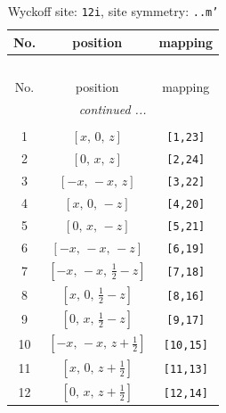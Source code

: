\documentclass[fleqn,8pt]{jsarticle}
\begin{document}
\begin{longtable}{ccc}
\caption{Wyckoff site: {\tt 12i}, site symmetry: {\tt ..m'}}
 \\
 \hline \hline
No. & position & mapping \\ \hline \endfirsthead

\multicolumn{2}{l}{\tablename\ \thetable{}} \\
 \hline \hline
No. & position & mapping \\ \hline \endhead

 \hline \hline
\multicolumn{2}{r}{\footnotesize\it continued ...} \\ \endfoot

 \hline \hline
\multicolumn{2}{r}{} \\ \endlastfoot

1 & $\left[ x,\, 0,\, z \right]$ & {\tt [1,23]} \\ \hline
2 & $\left[ 0,\, x,\, z \right]$ & {\tt [2,24]} \\ \hline
3 & $\left[ - x,\, - x,\, z \right]$ & {\tt [3,22]} \\ \hline
4 & $\left[ x,\, 0,\, - z \right]$ & {\tt [4,20]} \\ \hline
5 & $\left[ 0,\, x,\, - z \right]$ & {\tt [5,21]} \\ \hline
6 & $\left[ - x,\, - x,\, - z \right]$ & {\tt [6,19]} \\ \hline
7 & $\left[ - x,\, - x,\, \frac{1}{2} - z \right]$ & {\tt [7,18]} \\ \hline
8 & $\left[ x,\, 0,\, \frac{1}{2} - z \right]$ & {\tt [8,16]} \\ \hline
9 & $\left[ 0,\, x,\, \frac{1}{2} - z \right]$ & {\tt [9,17]} \\ \hline
10 & $\left[ - x,\, - x,\, z + \frac{1}{2} \right]$ & {\tt [10,15]} \\ \hline
11 & $\left[ x,\, 0,\, z + \frac{1}{2} \right]$ & {\tt [11,13]} \\ \hline
12 & $\left[ 0,\, x,\, z + \frac{1}{2} \right]$ & {\tt [12,14]} \\
\end{longtable}
\renewcommand{\arraystretch}{1.2}
\end{document}

